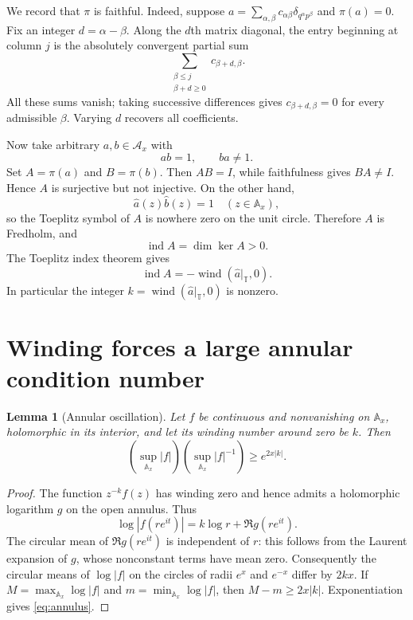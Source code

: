 \documentclass[11pt]{article}
\newtheorem{lemma}{Lemma}
\newcommand{\A}{\mathcal A}
\begin{document}
We record that $\pi$ is faithful.  Indeed, suppose
$a=\sum_{\alpha,\beta}c_{\alpha\beta}
\delta_{q^\alpha p^\beta}$ and $\pi(a)=0$.  Fix an integer
$d=\alpha-\beta$.  Along the $d$th matrix diagonal, the entry beginning at
column $j$ is the absolutely convergent partial sum
\[
 \sum_{\substack{\beta\le j\\\beta+d\ge0}}c_{\beta+d,\beta}.
\]
All these sums vanish; taking successive differences gives
$c_{\beta+d,\beta}=0$ for every admissible $\beta$.  Varying $d$ recovers all
coefficients.

Now take arbitrary $a,b\in\A_x$ with
\begin{equation}\label{eq:onesided}
                         ab=1,\qquad ba\ne1.
\end{equation}
Set $A=\pi(a)$ and $B=\pi(b)$.  Then $AB=I$, while faithfulness gives
$BA\ne I$.  Hence $A$ is surjective but not injective.  On the other hand,
\[
                     \widehat a(z)\widehat b(z)=1
                     \quad(z\in\mathbb A_x),
\]
so the Toeplitz symbol of $A$ is nowhere zero on the unit circle.  Therefore
$A$ is Fredholm, and
\[
 \operatorname{ind}A=\dim\ker A>0.
\]
The Toeplitz index theorem \cite[Chapter 7]{Douglas1972} gives
\begin{equation}\label{eq:index}
 \operatorname{ind}A=-\operatorname{wind}
       (\widehat a|_{\mathbb T},0).
\end{equation}
In particular the integer
$k=\operatorname{wind}(\widehat a|_{\mathbb T},0)$ is nonzero.

\section{Winding forces a large annular condition number}

\begin{lemma}[Annular oscillation]\label{lem:annulus}
Let $f$ be continuous and nonvanishing on $\mathbb A_x$, holomorphic in its
interior, and let its winding number around zero be $k$.  Then
\begin{equation}\label{eq:annulus}
 \left(\sup_{\mathbb A_x}|f|\right)
 \left(\sup_{\mathbb A_x}|f|^{-1}\right)
 \ge e^{2x|k|}.
\end{equation}
\end{lemma}

\begin{proof}
The function $z^{-k}f(z)$ has winding zero and hence admits a holomorphic
logarithm $g$ on the open annulus.  Thus
\[
                 \log|f(re^{it})|=k\log r+\Re g(re^{it}).
\]
The circular mean of $\Re g(re^{it})$ is independent of $r$: this follows
from the Laurent expansion of $g$, whose nonconstant terms have mean zero.
Consequently the circular means of $\log|f|$ on the circles of radii $e^x$
and $e^{-x}$ differ by $2kx$.  If
$M=\max_{\mathbb A_x}\log|f|$ and
$m=\min_{\mathbb A_x}\log|f|$, then
$M-m\ge2x|k|$.  Exponentiation gives \eqref{eq:annulus}.
\end{proof}
\end{document}
